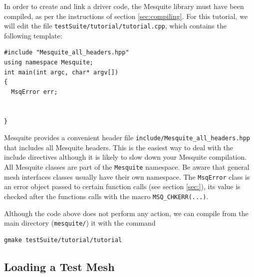 \documentclass[letter]{report}
\begin{document}
In order to create and link a driver code, the Mesquite library must have been compiled, as per the
instructions of section \ref{sec:compiling}. For this tutorial, we will edit the file
\texttt{testSuite/tutorial/tutorial.cpp}, which contains the following template:
\begin{verbatim}
#include "Mesquite_all_headers.hpp"
using namespace Mesquite;
int main(int argc, char* argv[])
{
  MsqError err;
  
  
}
\end{verbatim}
Mesquite provides a convenient header file \texttt{include/Mesquite\_all\_headers.hpp} that includes
all Mesquite headers. This is the easiest way to deal with the include directives although it is likely to slow
down your Mesquite compilation.
All Mesquite classes are part of the \texttt{Mesquite} namespace. Be aware that general mesh interfaces
classes usually have their own namespace. The \texttt{MsqError} class is an error object passed to 
certain function calls (see section \ref{sec:}), its value is checked after the functions calls with
the macro \texttt{MSQ\_CHKERR(...)}.

Although the code above does not perform any action, we can compile from the main directory
(\texttt{mesquite/}) it with the command 
\begin{verbatim}
gmake testSuite/tutorial/tutorial
\end{verbatim}

\subsection{Loading a Test Mesh}
\end{document}
